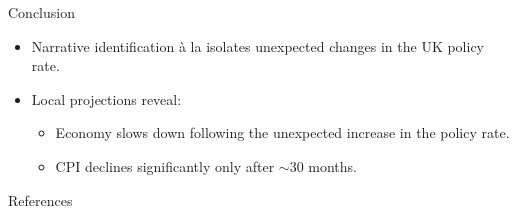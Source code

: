 \documentclass[aspectratio=169]{beamer}          %
\begin{document}
\begin{frame}{Conclusion}
\begin{itemize}
  \item Narrative identification à la \textcite{cloyneMacroeconomicEffectsMonetary2016}
        isolates unexpected changes in the UK policy rate.
  \item Local projections reveal:
        \begin{itemize}
            \item Economy slows down following the unexpected increase in the policy rate.
            \item CPI declines significantly only after $\sim$30 months.
        \end{itemize}
\end{itemize}
\end{frame}

\begin{frame}[allowframebreaks]{References}
  \printbibliography[heading=none]
\end{frame}
\end{document}
